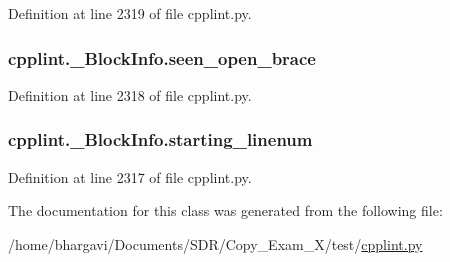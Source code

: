Definition at line 2319 of file cpplint.\+py.

\subsubsection[{\texorpdfstring{seen\+\_\+open\+\_\+brace}{seen_open_brace}}]{\setlength{\rightskip}{0pt plus 5cm}cpplint.\+\_\+\+Block\+Info.\+seen\+\_\+open\+\_\+brace}\hypertarget{classcpplint_1_1___block_info_aa974539217437751383ad20896c974d7}{}\label{classcpplint_1_1___block_info_aa974539217437751383ad20896c974d7}


Definition at line 2318 of file cpplint.\+py.

\subsubsection[{\texorpdfstring{starting\+\_\+linenum}{starting_linenum}}]{\setlength{\rightskip}{0pt plus 5cm}cpplint.\+\_\+\+Block\+Info.\+starting\+\_\+linenum}\hypertarget{classcpplint_1_1___block_info_a81d316f03e42aebbfe0636f905c4c291}{}\label{classcpplint_1_1___block_info_a81d316f03e42aebbfe0636f905c4c291}


Definition at line 2317 of file cpplint.\+py.



The documentation for this class was generated from the following file\+:\begin{DoxyCompactItemize}
\item 
/home/bhargavi/\+Documents/\+S\+D\+R/\+Copy\+\_\+\+Exam\+\_\+X/test/\hyperlink{cpplint_8py}{cpplint.\+py}\end{DoxyCompactItemize}
